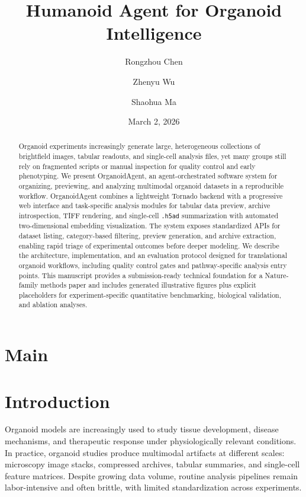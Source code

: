\documentclass[11pt]{article}
\title{Humanoid Agent for Organoid Intelligence}
\author{
Rongzhou Chen \and Zhenyu Wu \and Shaohua Ma
}
\date{March 2, 2026}
\begin{document}
\maketitle
\linenumbers
\doublespacing

\begin{abstract}
Organoid experiments increasingly generate large, heterogeneous collections of brightfield images, tabular readouts, and single-cell analysis files, yet many groups still rely on fragmented scripts or manual inspection for quality control and early phenotyping. We present OrganoidAgent, an agent-orchestrated software system for organizing, previewing, and analyzing multimodal organoid datasets in a reproducible workflow. OrganoidAgent combines a lightweight Tornado backend with a progressive web interface and task-specific analysis modules for tabular data preview, archive introspection, TIFF rendering, and single-cell \texttt{.h5ad} summarization with automated two-dimensional embedding visualization. The system exposes standardized APIs for dataset listing, category-based filtering, preview generation, and archive extraction, enabling rapid triage of experimental outcomes before deeper modeling. We describe the architecture, implementation, and an evaluation protocol designed for translational organoid workflows, including quality control gates and pathway-specific analysis entry points. This manuscript provides a submission-ready technical foundation for a Nature-family methods paper and includes generated illustrative figures plus explicit placeholders for experiment-specific quantitative benchmarking, biological validation, and ablation analyses.
\end{abstract}

\section*{Main}

\section{Introduction}
Organoid models are increasingly used to study tissue development, disease mechanisms, and therapeutic response under physiologically relevant conditions. In practice, organoid studies produce multimodal artifacts at different scales: microscopy image stacks, compressed archives, tabular summaries, and single-cell feature matrices. Despite growing data volume, routine analysis pipelines remain labor-intensive and often brittle, with limited standardization across experiments.
\end{document}
